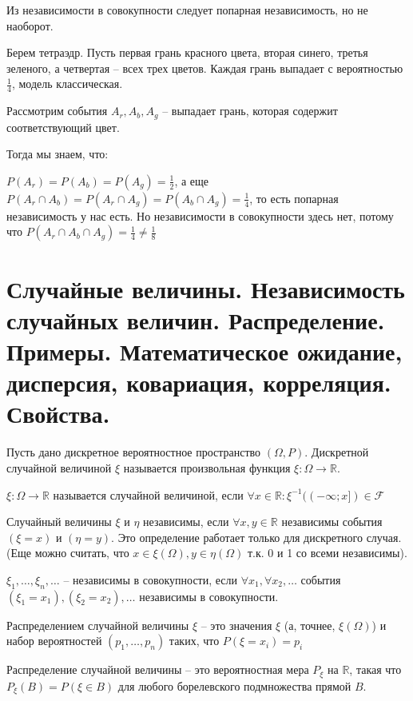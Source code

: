 \Note Из независимости в совокупности следует попарная независимость, но не наоборот.

\Example Берем тетраэдр. Пусть первая грань красного цвета, вторая синего, третья зеленого, а четвертая -- всех трех цветов.
Каждая грань выпадает с вероятностью $\frac{1}{4}$, модель классическая.

Рассмотрим события $A_r, A_b, A_g$ -- выпадает грань, которая содержит соответствующий цвет.

Тогда мы знаем, что: 

$P(A_r) = P(A_b) = P(A_g) = \frac{1}{2}$, а еще $P(A_r \cap A_b) = P(A_r \cap A_g) = P(A_b \cap A_g) = \frac{1}{4}$, то есть попарная независимость у нас есть. Но независимости в совокупности здесь нет, потому что $P(A_r \cap A_b \cap A_g) = \frac{1}{4} \neq \frac{1}{8}$

\newpage{}

\section{Случайные величины. Независимость случайных величин. Распределение. Примеры. Математическое ожидание, дисперсия, ковариация, корреляция. Свойства.}

\Def Пусть дано дискретное вероятностное пространство $(\Omega, P)$. Дискретной случайной величиной $\xi$ называется произвольная функция $\xi 
: \Omega \to \mathbb{R}$.

\leftbar

\Def $\xi : \Omega \to \mathbb{R}$ называется случайной величиной, если $\forall x \in \mathbb{R} :  \xi^{-1}((-\infty; x]) \in \mathcal{F}$
\endleftbar

\Def Случайный величины $\xi$ и $\eta$ независимы, если $\forall x, y \in \mathbb{R}$ независимы события $(\xi = x)$ и $(\eta = y)$. Это определение работает только для дискретного случая. (Еще можно считать, что $x \in \xi(\Omega), y \in \eta(\Omega)$ т.к. 0 и 1 со всеми независимы).

\Def $\xi_1, \dots, \xi_n, \dots$  -- независимы в совокупности, если $\forall x_1, \forall x_2, \dots$ события $(\xi_1 = x_1), (\xi_2 = x_2), \dots$ независимы в совокупности.

\Def Распределением случайной величины $\xi$ -- это значения $\xi$ (а, точнее, $\xi(\Omega)$) и набор вероятностей $(p_1, \dots, p_n)$ таких, что $P(\xi = x_i) = p_i$

\leftbar

\Def Распределение случайной величины -- это вероятностная мера $P_{\xi}$ на $\mathbb{R}$, такая что $P_{\xi}(B) = P(\xi \in B)$ для любого борелевского подмножества прямой $B$.
\endleftbar

